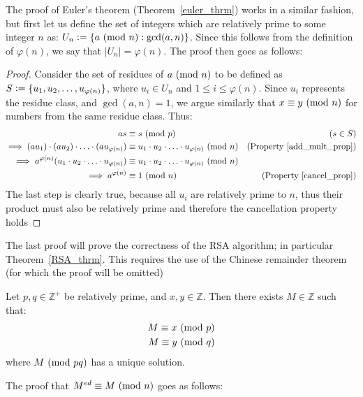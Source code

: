 The proof of Euler's theorem (Theorem~\ref{euler_thrm}) works in a similar fashion, but first let us define the set of integers which are relatively prime to some integer $n$ as: $U_n \vcentcolon= \{ a ~(\mathrm{mod}~n) : \gcd(a, n) \}$. Since this follows from the definition of $\varphi(n)$, we say that $|U_n| = \varphi(n)$. The proof then goes as follows:
\begin{proof}
Consider the set of residues of $a ~(\mathrm{mod}~n)$ to be defined as\\
$S \vcentcolon= \{ u_1, u_2, \ldots, u_{\varphi(n)} \}$, where $u_i \in U_n$ and $1 \leq i \leq \varphi(n)$. Since $u_i$ represents the residue class, and $\gcd(a, n) = 1$, we argue similarly that $x \equiv y ~(\mathrm{mod}~n)$ for numbers from the same residue class. Thus:
\begin{align*}
as &\equiv s~(\text{mod}~p) & (s \in S)\\
\implies (a u_1) \cdot (a u_2) \cdot \ldots \cdot (a u_{\varphi(n)}) &\equiv u_1 \cdot u_2 \cdot \ldots \cdot u_{\varphi(n)} ~(\mathrm{mod}~n) & (\text{Property}~\ref{add_mult_prop}) \\
\implies a^{\varphi(n)} (u_1 \cdot u_2 \cdot \ldots \cdot u_{\varphi(n)}) &\equiv u_1 \cdot u_2 \cdot \ldots \cdot u_{\varphi(n)} ~(\mathrm{mod}~n) \\
\implies a^{\varphi(n)} &\equiv 1 ~(\mathrm{mod}~n) & (\text{Property}~\ref{cancel_prop})
\end{align*}
The last step is clearly true, because all $u_i$ are relatively prime to $n$, thus their product must also be relatively prime and therefore the cancellation property holds
\end{proof}
The last proof will prove the correctness of the RSA algorithm; in particular Theorem~\ref{RSA_thrm}. This requires the use of the Chinese remainder theorem (for which the proof will be omitted)
\begin{theorem}
\label{chinese_thrm}
Let $p, q \in \mathbb{Z^{+}}$ be relatively prime, and $x, y \in \mathbb{Z}$. Then there exists $M \in \mathbb{Z}$ such that:
\begin{align*}
M \equiv x ~(\mathrm{mod}~p) \\
M \equiv y ~(\mathrm{mod}~q)	
\end{align*}
where $M ~(\mathrm{mod}~pq)$ has a unique solution.
\end{theorem}
The proof that $M^{ed} \equiv M ~(\mathrm{mod}~n)$ goes as follows:
